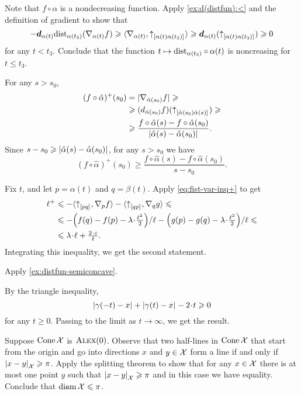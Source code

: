 Note that $f\circ\alpha$ is a nondecreasing function.
Apply \ref{ex:d(distfun):<} and the definition of gradient to show that
\[
-\bm{d}_{\alpha(t)}\mathrm{dist}_{\alpha(t_3)}(\nabla_{\alpha(t)}f)
\geqslant
\langle \nabla_{\alpha(t)},{\uparrow}_{[{\alpha(t)}{\alpha(t_3)}]_{{}}}\rangle
\geqslant
\bm{d}_{\alpha(t)}({\uparrow}_{[{\alpha(t)}{\alpha(t_3)}]_{{}}})
\geqslant0
\]
for any $t<t_3$.
Conclude that the function 
$t\mapsto \mathrm{dist}_{\alpha(t_3)}\circ\alpha(t)$ is noncreasing for $t\le t_3$.

For any $s>s_0$,
\begin{align*}
(f\circ\hat\alpha)^+(s_0)&=|\nabla_{\hat\alpha(s_0)}f|
\geqslant
\\
&\geqslant
(d_{\hat\alpha(s_0)}f)({\uparrow}_{[{\hat\alpha(s_0)}{\hat\alpha(s)}]_{{}}})
\geqslant
\\
&\geqslant
\frac{f\circ\hat\alpha(s)-f\circ\hat\alpha(s_0)}{|{\hat\alpha(s)}-{\hat\alpha(s_0)}|_{}^{{}}}.
\end{align*} 
Since $s-s_0\geqslant|{\hat\alpha(s)}-{\hat\alpha(s_0)}|_{}^{{}}$, for any $s>s_0$ we have 
\[(f\circ\hat\alpha)^+(s_0)\ge
\frac{f\circ\hat\alpha(s)-f\circ\hat\alpha(s_0)}{s-s_0}.\]

Fix $t$, and let $p=\alpha(t)$ and $q=\beta(t)$.
Apply \ref{eq:fist-var-inq+} to get
\begin{align*}
 \ell^+
&\le -\<\dir{p}{q},\nabla_{p}f\>
-\<\dir{q}{p},\nabla_{q}g\>
\le
\\
&\le -{\left({f(q)}-{f(p)}-\lambda\cdot\tfrac{\ell^2}2\right)}/{\ell}
-{\left({g(p)}-{g(q)}-\lambda\cdot\tfrac{\ell^2}2\right)}/{\ell}\le
\\
&\le \lambda\cdot\ell+\tfrac{2\cdot\eps}{\ell}.
\end{align*}
Integrating this inequality, we get the second statement.

 Apply \ref{ex:distfun-semiconcave}.

 By the triangle inequality, 
\[\dist{\gamma(-t)}{x}{}+\dist{\gamma(t)}{x}{}-2\cdot t\ge 0\]
for any $t\ge 0$.
Passing to the limit as $t\to\infty$, we get the result.

Suppose $\mathop{\rm Cone}\nolimits\mathcal{X}$ is $\textsc{Alex}(0)$.
Observe that two half-lines in $\mathop{\rm Cone}\nolimits\mathcal{X}$ that start from the origin and go into directions $x$ and $y\in\mathcal{X}$ form a line if and only if $|{x}-{y}|_{\mathcal{X}}^{{}}\geqslant \pi$.
Apply the splitting theorem to show that for any $x\in \mathcal{X}$ there is at most one point $y$ such that $|{x}-{y}|_{\mathcal{X}}^{{}}\geqslant \pi$ and in this case we have equality.
Conclude that $\operatorname{\rm diam}\nolimits \mathcal{X}\leqslant \pi$.

